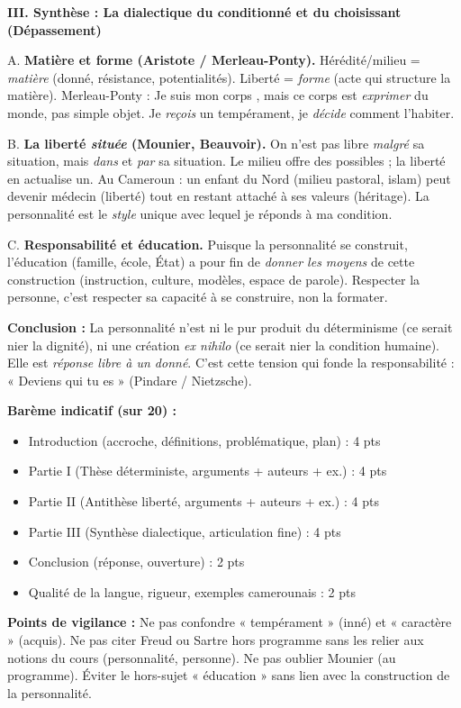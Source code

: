 \documentclass[11pt]{article}
\begin{document}
\begin{corrige}
\textbf{III. Synthèse : La dialectique du conditionné et du choisissant (Dépassement)}
\par A. \textbf{Matière et forme (Aristote / Merleau-Ponty).} Hérédité/milieu = \emph{matière} (donné, résistance, potentialités). Liberté = \emph{forme} (acte qui structure la matière). Merleau-Ponty : \guillemotleft Je suis mon corps \guillemotright, mais ce corps est \emph{exprimer} du monde, pas simple objet. Je \emph{reçois} un tempérament, je \emph{décide} comment l'habiter.
\par B. \textbf{La liberté \emph{située} (Mounier, Beauvoir).} On n'est pas libre \emph{malgré} sa situation, mais \emph{dans} et \emph{par} sa situation. Le milieu offre des possibles ; la liberté en actualise un. Au Cameroun : un enfant du Nord (milieu pastoral, islam) peut devenir médecin (liberté) tout en restant attaché à ses valeurs (héritage). La personnalité est le \emph{style} unique avec lequel je réponds à ma condition.
\par C. \textbf{Responsabilité et éducation.} Puisque la personnalité se construit, l'éducation (famille, école, État) a pour fin de \emph{donner les moyens} de cette construction (instruction, culture, modèles, espace de parole). Respecter la personne, c'est respecter sa capacité à se construire, non la formater.

\textbf{Conclusion :} La personnalité n'est ni le pur produit du déterminisme (ce serait nier la dignité), ni une création \emph{ex nihilo} (ce serait nier la condition humaine). Elle est \emph{réponse libre à un donné}. C'est cette tension qui fonde la responsabilité : « Deviens qui tu es » (Pindare / Nietzsche).

\textbf{Barème indicatif (sur 20) :}
\begin{itemize}
\item Introduction (accroche, définitions, problématique, plan) : 4 pts
\item Partie I (Thèse déterministe, arguments + auteurs + ex.) : 4 pts
\item Partie II (Antithèse liberté, arguments + auteurs + ex.) : 4 pts
\item Partie III (Synthèse dialectique, articulation fine) : 4 pts
\item Conclusion (réponse, ouverture) : 2 pts
\item Qualité de la langue, rigueur, exemples camerounais : 2 pts
\end{itemize}
\textbf{Points de vigilance :} Ne pas confondre « tempérament » (inné) et « caractère » (acquis). Ne pas citer Freud ou Sartre hors programme sans les relier aux notions du cours (personnalité, personne). Ne pas oublier Mounier (au programme). Éviter le hors-sujet « éducation » sans lien avec la construction de la personnalité.
\end{corrige}
\end{document}
